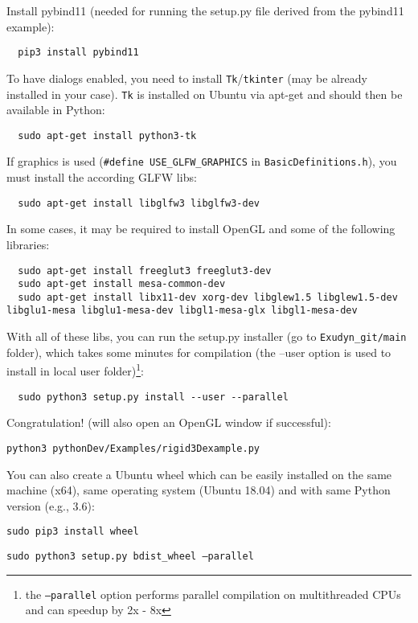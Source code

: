 \noindent Install pybind11 (needed for running the setup.py file derived from the pybind11 example):
\begin{lstlisting}
  pip3 install pybind11
\end{lstlisting}

\noindent To have dialogs enabled, you need to install \texttt{Tk}/\texttt{tkinter} (may be already installed in your case). 
\texttt{Tk} is installed on Ubuntu via apt-get and should then be available in Python:
\begin{lstlisting}
  sudo apt-get install python3-tk
\end{lstlisting}

\noindent 
If graphics is used (\texttt{\#define USE\_GLFW\_GRAPHICS} in \texttt{BasicDefinitions.h}), you must install the according GLFW libs:
\begin{lstlisting}
  sudo apt-get install libglfw3 libglfw3-dev
\end{lstlisting}

In some cases, it may be required to install OpenGL and some of the following libraries:
\begin{lstlisting}
  sudo apt-get install freeglut3 freeglut3-dev
  sudo apt-get install mesa-common-dev
  sudo apt-get install libx11-dev xorg-dev libglew1.5 libglew1.5-dev libglu1-mesa libglu1-mesa-dev libgl1-mesa-glx libgl1-mesa-dev
\end{lstlisting}

\noindent 
With all of these libs, you can run the setup.py installer (go to \texttt{Exudyn\_git/main} folder), which takes some minutes for compilation (the --user option is used to install in local user folder)\footnote{the \texttt{--parallel} option performs parallel compilation on multithreaded CPUs and can speedup by 2x - 8x}:
\begin{lstlisting}
  sudo python3 setup.py install --user --parallel
\end{lstlisting}

\noindent 
Congratulation!  (will also open an OpenGL window if successful):
\bi
  \item[] \texttt{python3 pythonDev/Examples/rigid3Dexample.py}
\ei

\noindent You can also create a Ubuntu wheel which can be easily installed on the same machine (x64), same operating system (Ubuntu 18.04) and with same Python version (e.g., 3.6):
\bi
  \item[] \texttt{sudo pip3 install wheel}
  \item[] \texttt{sudo python3 setup.py bdist\_wheel --parallel}
\ei

